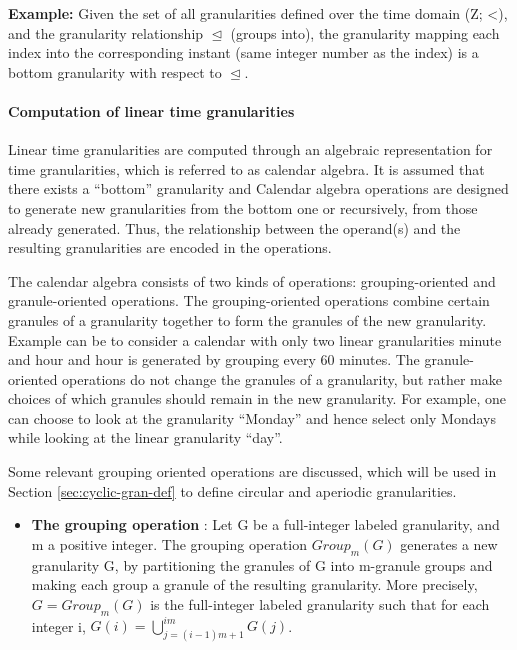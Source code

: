 \documentclass[12pt]{article}
\providecommand{\tightlist}{%
  \setlength{\itemsep}{0pt}\setlength{\parskip}{0pt}}
\begin{document}
\textbf{Example:} Given the set of all granularities defined over the
time domain (Z; \textless{}), and the granularity relationship
\(\trianglelefteq\) (groups into), the granularity mapping each index
into the corresponding instant (same integer number as the index) is a
bottom granularity with respect to \(\trianglelefteq\).

\hypertarget{computation-of-linear-time-granularities}{%
\paragraph{Computation of linear time
granularities}\label{computation-of-linear-time-granularities}}

Linear time granularities are computed through an algebraic
representation for time granularities, which is referred to as calendar
algebra\citep{Ning2002-tf}. It is assumed that there exists a ``bottom''
granularity and Calendar algebra operations are designed to generate new
granularities from the bottom one or recursively, from those already
generated. Thus, the relationship between the operand(s) and the
resulting granularities are encoded in the operations.

The calendar algebra consists of two kinds of operations:
grouping-oriented and granule-oriented operations. The grouping-oriented
operations combine certain granules of a granularity together to form
the granules of the new granularity. Example can be to consider a
calendar with only two linear granularities minute and hour and hour is
generated by grouping every 60 minutes. The granule-oriented operations
do not change the granules of a granularity, but rather make choices of
which granules should remain in the new granularity. For example, one
can choose to look at the granularity ``Monday'' and hence select only
Mondays while looking at the linear granularity ``day''.

Some relevant grouping oriented operations are discussed, which will be
used in Section \ref{sec:cyclic-gran-def} to define circular and
aperiodic granularities.

\begin{itemize}
\tightlist
\item
  \textbf{The grouping operation} : Let G be a full-integer labeled
  granularity, and m a positive integer. The grouping operation
  \(Group_m(G)\) generates a new granularity G, by partitioning the
  granules of G into m-granule groups and making each group a granule of
  the resulting granularity. More precisely, \(G = Group_m(G)\) is the
  full-integer labeled granularity such that for each integer i,
  \(G(i) = \bigcup\limits_{j = (i-1)m+1}^{im} G(j)\).
\end{itemize}
\end{document}
